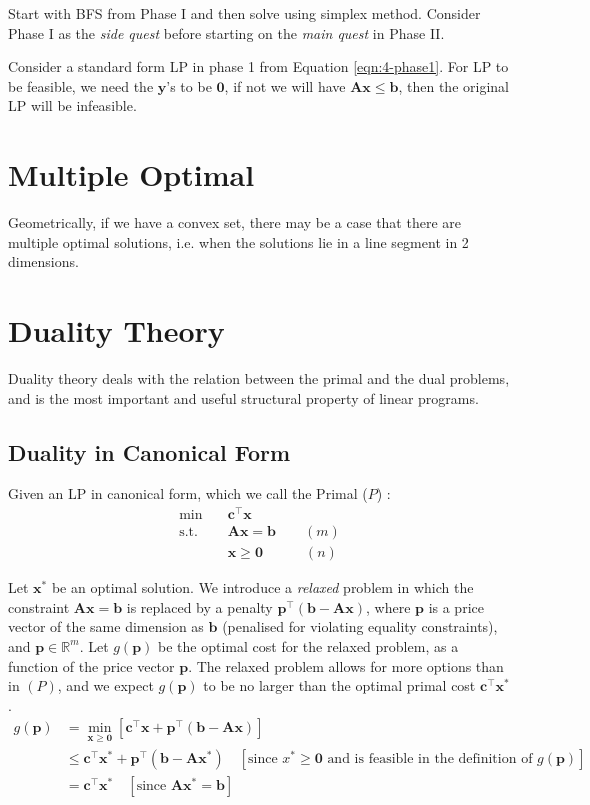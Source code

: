 \documentclass{article}
\begin{document}
Start with BFS from Phase I and then solve using simplex method. Consider Phase I as the \textit{side quest} before starting on the \textit{main quest} in Phase II. 

Consider a standard form LP in phase 1 from Equation \ref{eqn:4-phase1}. For LP to be feasible, we need the $\mathbf{y}$'s to be $\mathbf{0}$, if not we will have $\mathbf{Ax} \leq \mathbf{b}$, then the original LP will be infeasible. 


\section{Multiple Optimal}
Geometrically, if we have a convex set, there may be a case that there are multiple optimal solutions, i.e. when the solutions lie in a line segment in 2 dimensions. 

\section{Duality Theory}

Duality theory deals with the relation between the primal and the dual problems, and is the most important and useful structural property of linear programs. 

\subsection{Duality in Canonical Form}

Given an LP in canonical form, which we call the Primal ($P$) : \begin{align*}
    \min \quad & \mathbf{c}^{\top} \mathbf{x} \\ 
    \text{s.t.} \quad & \mathbf{Ax} = \mathbf{b} \qquad (m)\\ 
    \quad & \mathbf{x} \geq \mathbf{0} \qquad \quad (n)
\end{align*}

\noindent Let $\mathbf{x}^{*}$ be an optimal solution. We introduce a \textit{relaxed} problem in which the constraint $\mathbf{Ax} = \mathbf{b}$ is replaced by a penalty $\mathbf{p}^{\top}(\mathbf{b} - \mathbf{Ax})$, where $\mathbf{p}$ is a price vector of the same dimension as $\mathbf{b}$ (penalised for violating equality constraints), and $\mathbf{p} \in \mathbb{R}^{m}$. Let $g(\mathbf{p})$ be the optimal cost for the relaxed problem, as a function of the price vector $\mathbf{p}$. The relaxed problem allows for more options than in $(P)$, and we expect $g(\mathbf{p})$ to be no larger than the optimal primal cost $\mathbf{c}^{\top}\mathbf{x}^{*}$. \begin{align}
    g(\mathbf{p}) &= \min_{\mathbf{x} \geq \mathbf{0}} \left[\mathbf{c}^{\top}\mathbf{x} + \mathbf{p}^{\top}(\mathbf{b}-\mathbf{Ax})\right] \\ 
    &\leq \mathbf{c}^{\top}\mathbf{x}^{*} + \mathbf{p}^{\top}(\mathbf{b}-\mathbf{Ax^{*}}) \quad [\text{since }x^{*} \geq \mathbf{0}\text{ and is feasible in the definition of }g(\mathbf{p})] \\ 
    &= \mathbf{c}^{\top}\mathbf{x}^{*} \quad [\text{since } \mathbf{Ax^{*}} = \mathbf{b}]
\end{align}
\end{document}
